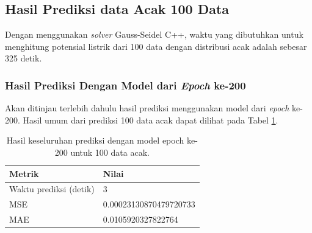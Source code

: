 \subsection{Hasil Prediksi data Acak 100 Data}
Dengan menggunakan \textit{solver} Gauss-Seidel C++, waktu yang dibutuhkan untuk menghitung potensial listrik dari 100 data dengan distribusi acak adalah sebesar 325 detik.

\subsubsection{Hasil Prediksi Dengan Model dari \textit{Epoch} ke-200}
Akan ditinjau terlebih dahulu hasil prediksi menggunakan model dari \textit{epoch} ke-200. Hasil umum dari prediksi 100 data acak dapat dilihat pada Tabel \ref{200acak}.

\begin{table}[h!]
\centering
\caption{Hasil keseluruhan prediksi dengan model epoch ke-200 untuk 100 data acak.}
\label{200acak}
\begin{tabular}{ll}
\hline
\textbf{Metrik}        & \textbf{Nilai}         \\ \hline
Waktu prediksi (detik) & 3                      \\ \hline
MSE                    & 0.00023130870479720733 \\ \hline
MAE                    & 0.0105920327822764     \\ \hline
\end{tabular}
\end{table}

